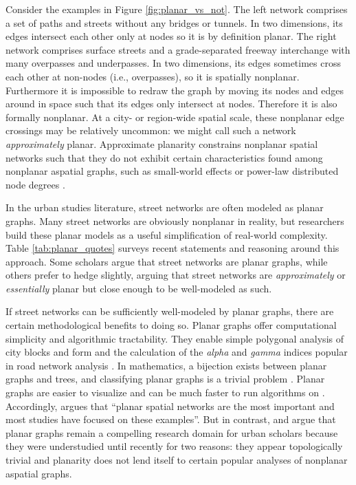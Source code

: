 \documentclass[Afour,sageh,times]{sagej}
\begin{document}
Consider the examples in Figure \ref{fig:planar_vs_not}. The left network comprises a set of paths and streets without any bridges or tunnels. In two dimensions, its edges intersect each other only at nodes so it is by definition planar. The right network comprises surface streets and a grade-separated freeway interchange with many overpasses and underpasses. In two dimensions, its edges sometimes cross each other at non-nodes (i.e., overpasses), so it is spatially nonplanar. Furthermore it is impossible to redraw the graph by moving its nodes and edges around in space such that its edges only intersect at nodes. Therefore it is also formally nonplanar. At a city- or region-wide spatial scale, these nonplanar edge crossings may be relatively uncommon: we might call such a network \emph{approximately} planar. Approximate planarity constrains nonplanar spatial networks such that they do not exhibit certain characteristics found among nonplanar aspatial graphs, such as small-world effects or power-law distributed node degrees \citep{crucitti_centrality_2006,fischer_spatial_2014}.

In the urban studies literature, street networks are often modeled as planar graphs. Many street networks are obviously nonplanar in reality, but researchers build these planar models as a useful simplification of real-world complexity. Table \ref{tab:planar_quotes} surveys recent statements and reasoning around this approach. Some scholars argue that street networks are planar graphs, while others prefer to hedge slightly, arguing that street networks are \emph{approximately} or \emph{essentially} planar but close enough to be well-modeled as such.

If street networks can be sufficiently well-modeled by planar graphs, there are certain methodological benefits to doing so. Planar graphs offer computational simplicity and algorithmic tractability. They enable simple polygonal analysis of city blocks and form \citep{fohl_non-planar_1996,barthelemy_paths_2017} and the calculation of the \emph{alpha} and \emph{gamma} indices popular in road network analysis \citep{eppstein_studying_2008}. In mathematics, a bijection exists between planar graphs and trees, and classifying planar graphs is a trivial problem \citep{louf_typology_2014}. Planar graphs are easier to visualize and can be much faster to run algorithms on \citep{liebers_planarizing_2001}. Accordingly, \citet[p.~3]{barthelemy_spatial_2011} argues that \enquote{planar spatial networks are the most important and most studies have focused on these examples}. But in contrast, \citet{masucci_random_2009} and \citet{masucci_limited_2013} argue that planar graphs remain a compelling research domain for urban scholars because they were understudied until recently for two reasons: they appear topologically trivial and planarity does not lend itself to certain popular analyses of nonplanar aspatial graphs.
\end{document}
